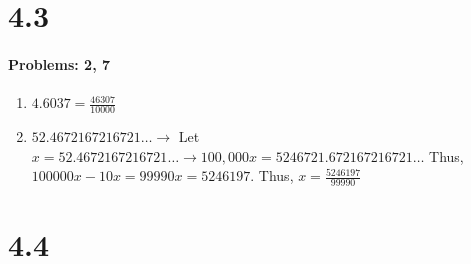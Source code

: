 \documentclass{article}
\makeatletter
\newcommand\setItemnumber[1]{\setcounter{enum\romannumeral\@enumdepth}{\numexpr#1-1\relax}}
\makeatother
\begin{document}
\section{4.3}
\paragraph{Problems: 2, 7}
\begin{enumerate}
    \setItemnumber{2}
    \item $4.6037 = \frac{46307}{10000}$
    \setItemnumber{7}
    \item $52.4672167216721\dots \rightarrow$ Let $x = 52.4672167216721\dots \rightarrow 100,000x = 5246721.672167216721\dots$ Thus, $100000x - 10x = 99990x = 5246197$. Thus, $x = \frac{5246197}{99990}$
\end{enumerate}

\section{4.4}
\end{document}
